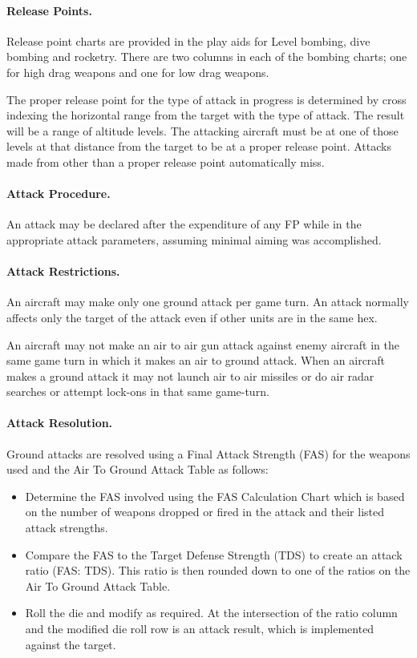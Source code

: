 \paragraph{Release Points.}\label{rule:release-points} Release point charts are provided in the play aids for Level bombing, dive bombing and rocketry. There are two columns in each of the bombing charts; one for high drag weapons and one for low drag weapons.

The proper release point for the type of attack in progress is determined by cross indexing the horizontal range from the target with the type of attack. The result will be a range of altitude levels. The attacking aircraft must be at one of those levels at that distance from the target to be at a proper release point. Attacks made from other than a proper release point automatically miss.

\paragraph{Attack Procedure.} An attack may be declared after the expenditure of any FP while in the appropriate attack parameters, assuming minimal aiming was accomplished.

\paragraph{Attack Restrictions.} An aircraft may make only one ground attack per game turn. An attack normally affects only the target of the attack even if other units are in the same hex.

An aircraft may not make an air to air gun attack against enemy aircraft in the same game turn in which it makes an air to ground attack. When an aircraft makes a ground attack it may not launch air to air missiles or do air radar searches or attempt lock-ons in that same game-turn.

\paragraph{Attack Resolution.} Ground attacks are resolved using a Final Attack Strength (FAS) for the weapons used and the Air To Ground Attack Table as follows:
\begin{itemize}
\item Determine the FAS involved using the FAS Calculation Chart which is based on the number of weapons dropped or fired in the attack and their listed attack strengths.
\item Compare the FAS to the Target Defense Strength (TDS) to create an attack ratio (FAS: TDS). This ratio is then rounded down to one of the ratios on the Air To Ground Attack Table.
\item Roll the die and modify as required. At the intersection of the ratio column and the modified die roll row is an attack result, which is implemented against the target.
\end{itemize}

